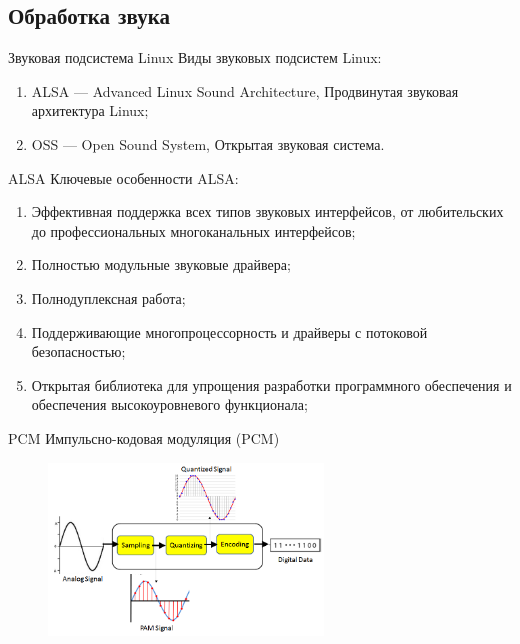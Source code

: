 \subsection{Обработка звука}

\begin{frame}{Звуковая подсистема Linux}
  Виды звуковых подсистем Linux:

  \begin{enumerate}
    \item ALSA --- Advanced Linux Sound Architecture, Продвинутая звуковая архитектура Linux;
    \item OSS --- Open Sound System, Открытая звуковая система.
  \end{enumerate}
\end{frame}

\begin{frame}{ALSA}
  Ключевые особенности ALSA:

  \begin{enumerate}
    \item Эффективная поддержка всех типов звуковых интерфейсов, от любительских до профессиональных многоканальных интерфейсов;
    \item Полностью модульные звуковые драйвера;
    \item Полнодуплексная работа;
    \item Поддерживающие многопроцессорность и драйверы с потоковой безопасностью;
    \item Открытая библиотека для упрощения разработки программного обеспечения и обеспечения высокоуровневого функционала;
  \end{enumerate}
\end{frame}

\begin{frame}{PCM}
  Импульсно-кодовая модуляция (PCM)

  \begin{figure}[H]
    \centering
    \includegraphics[width=0.65\textwidth]{assets/images/PCM.png}
    \label{img:sound__PCM}
  \end{figure}
\end{frame}

